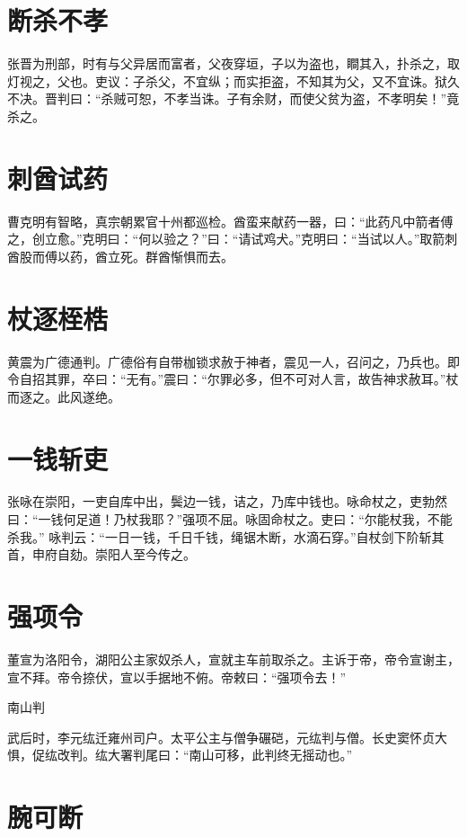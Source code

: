 \documentclass[a4paper,12pt,UTF8,twoside]{ctexbook}
\begin{document}
    \section{断杀不孝}
    
    张晋为刑部，时有与父异居而富者，父夜穿垣，子以为盗也，瞷其入，扑杀之，取灯视之，父也。吏议：子杀父，不宜纵；而实拒盗，不知其为父，又不宜诛。狱久不决。晋判曰：“杀贼可恕，不孝当诛。子有余财，而使父贫为盗，不孝明矣！”竟杀之。
    
    \section{刺酋试药}
    
    曹克明有智略，真宗朝累官十州都巡检。酋蛮来献药一器，曰：“此药凡中箭者傅之，创立愈。”克明曰：“何以验之？”曰：“请试鸡犬。”克明曰：“当试以人。”取箭刺酋股而傅以药，酋立死。群酋惭惧而去。
    
    \section{杖逐桎梏}
    
    黄震为广德通判。广德俗有自带枷锁求赦于神者，震见一人，召问之，乃兵也。即令自招其罪，卒曰：“无有。”震曰：“尔罪必多，但不可对人言，故告神求赦耳。”杖而逐之。此风遂绝。
    
    \section{一钱斩吏}
    
    张咏在崇阳，一吏自库中出，鬓边一钱，诘之，乃库中钱也。咏命杖之，吏勃然曰：“一钱何足道！乃杖我耶？”强项不屈。咏固命杖之。吏曰：“尔能杖我，不能杀我。” 咏判云：“一日一钱，千日千钱，绳锯木断，水滴石穿。”自杖剑下阶斩其首，申府自劾。崇阳人至今传之。
    
    \section{强项令}
    
    董宣为洛阳令，湖阳公主家奴杀人，宣就主车前取杀之。主诉于帝，帝令宣谢主，宣不拜。帝令捺伏，宣以手据地不俯。帝敕曰：“强项令去！”
    
    南山判
    
    武后时，李元纮迁雍州司户。太平公主与僧争碾硙，元纮判与僧。长史窦怀贞大惧，促纮改判。纮大署判尾曰：“南山可移，此判终无摇动也。”
    
    \section{腕可断}
    
\end{document}
